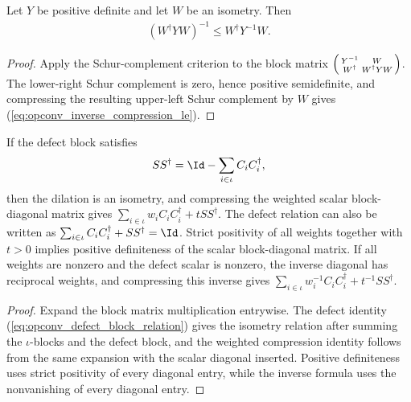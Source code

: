 \begin{lemma}\label{lem:operator_jensen_inverse_compression}
    \leanok
    Let $Y$ be positive definite and let $W$ be an isometry. Then
    \begin{align}
        (W^\dagger YW)^{-1}
        \le W^\dagger Y^{-1}W.
        \label{eq:opconv_inverse_compression_le}
    \end{align}
\end{lemma}

\begin{proof}
    \leanok
    Apply the Schur-complement criterion to the block matrix
    $\begin{psmallmatrix}Y^{-1}&W\\W^\dagger&W^\dagger YW\end{psmallmatrix}$.
    The lower-right Schur complement is zero, hence positive semidefinite, and
    compressing the resulting upper-left Schur complement by $W$ gives
    (\ref{eq:opconv_inverse_compression_le}).
\end{proof}

\begin{lemma}\label{lem:operator_jensen_povm_compression}
    \leanok
    If the defect block satisfies
    \begin{align}
        SS^\dagger
        =\Id-\sum_{i\in\iota}C_iC_i^\dagger,
        \label{eq:opconv_defect_block_relation}
    \end{align}
    then the dilation is an isometry, and compressing the weighted scalar
    block-diagonal matrix gives
    $\sum_{i\in\iota}w_iC_iC_i^\dagger+tSS^\dagger$.
    The defect relation can also be written as
    $\sum_{i\in\iota}C_iC_i^\dagger+SS^\dagger=\Id$.
    Strict positivity of all weights together with $t>0$ implies positive
    definiteness of the scalar block-diagonal matrix. If all weights are
    nonzero and the defect scalar is nonzero, the inverse diagonal has
    reciprocal weights, and compressing this inverse gives
    $\sum_{i\in\iota}w_i^{-1}C_iC_i^\dagger+t^{-1}SS^\dagger$.
\end{lemma}

\begin{proof}
    \leanok
    Expand the block matrix multiplication entrywise. The defect identity
    (\ref{eq:opconv_defect_block_relation}) gives the isometry relation after
    summing the $\iota$-blocks and the defect block, and the weighted
    compression identity follows from the same expansion with the scalar
    diagonal inserted. Positive definiteness uses strict positivity of every
    diagonal entry, while the inverse formula uses the nonvanishing of every
    diagonal entry.
\end{proof}

